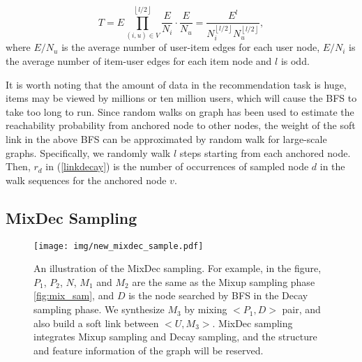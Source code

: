 \begin{equation}
    T=
    E\prod_{(i,u)\in V}^{\left \lfloor l/2\right \rfloor}  \frac{E}{N_i}\cdot\frac{E}{N_u}=\frac{E^l}{N_i^{\left\lfloor l/2\right\rfloor}N_u^{\left\lfloor l/2\right\rfloor}},
\end{equation}
where ${E}/{N_u}$ is the average number of user-item edges for each user node, ${E}/{N_i}$ is the average number of item-user edges for each item node and $l$ is odd. 

It is worth noting that the amount of data in the recommendation task is huge, \eg items may be viewed by millions or ten million users, which will cause the BFS to take too long to run.
Since random walks \cite{perozzi2014deepwalk} on graph has been used to estimate the reachability probability from anchored node to other nodes, the weight of the soft link in the above BFS can be approximated by random walk for large-scale graphs.
Specifically, we randomly walk $l$ steps starting from each anchored node. Then, $r_d$ in (\ref{linkdecay}) is the number of occurrences of sampled node $d$ in the walk sequences for the anchored node $v$.


\subsection{\textbf{MixDec Sampling}}

\begin{figure}[t]
    \centering
    
    \texttt{[image: img/new\_mixdec\_sample.pdf]}
    \caption{An illustration of the MixDec sampling. For example, in the figure, \(P_1\), \(P_2\), \(N\), \(M_1\) and \(M_2\) are the same as the Mixup sampling phase \ref{fig:mix_sam}, and \(D\) is the node searched by BFS in the Decay sampling phase. We synthesize \(M_3\) by mixing $<P_1, D>$ pair, and also build a soft link between $<U, M_3>$. MixDec sampling integrates Mixup sampling and Decay sampling, and the structure and feature information of the graph will be reserved.}
    \label{fig:mixdec_sam}
\end{figure}

